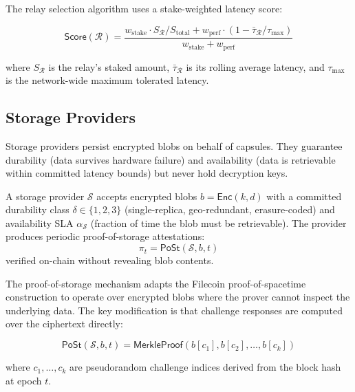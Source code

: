 The relay selection algorithm uses a stake-weighted latency score:

\begin{equation}\label{eq:relay-score}
    \mathsf{Score}(\mathcal{R}) = \frac{w_{\text{stake}} \cdot S_{\mathcal{R}} / S_{\text{total}} + w_{\text{perf}} \cdot (1 - \bar{\tau}_{\mathcal{R}} / \tau_{\max})}{w_{\text{stake}} + w_{\text{perf}}}
\end{equation}

where $S_{\mathcal{R}}$ is the relay's staked amount, $\bar{\tau}_{\mathcal{R}}$
is its rolling average latency, and $\tau_{\max}$ is the network-wide maximum
tolerated latency.

\subsection{Storage Providers}

Storage providers persist encrypted blobs on behalf of capsules. They guarantee
durability (data survives hardware failure) and availability (data is retrievable
within committed latency bounds) but never hold decryption keys.

\begin{definition}
A storage provider $\mathcal{S}$ accepts encrypted blobs $b = \mathsf{Enc}(k, d)$
with a committed durability class $\delta \in \{1, 2, 3\}$ (single-replica,
geo-redundant, erasure-coded) and availability SLA $\alpha_{\mathcal{S}}$
(fraction of time the blob must be retrievable). The provider produces
periodic proof-of-storage attestations:
\begin{equation}
    \pi_t = \mathsf{PoSt}(\mathcal{S}, b, t)
\end{equation}
verified on-chain without revealing blob contents.
\end{definition}

The proof-of-storage mechanism adapts the Filecoin proof-of-spacetime
construction \cite{benet2017filecoin} to operate over encrypted blobs where
the prover cannot inspect the underlying data. The key modification is that
challenge responses are computed over the ciphertext directly:

\begin{equation}
    \mathsf{PoSt}(\mathcal{S}, b, t) = \mathsf{MerkleProof}(b[c_1], b[c_2], \ldots, b[c_k])
\end{equation}

where $c_1, \ldots, c_k$ are pseudorandom challenge indices derived from the
block hash at epoch $t$.

